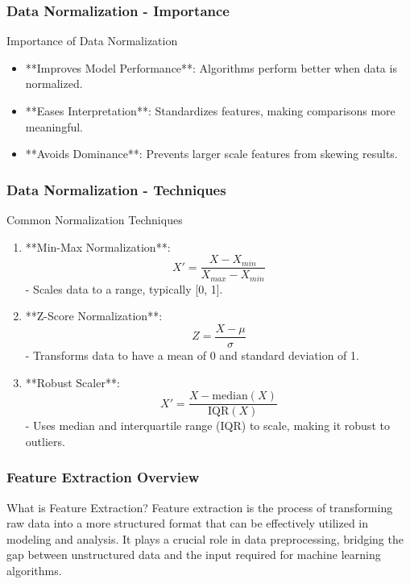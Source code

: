 \documentclass[aspectratio=169]{beamer}
\begin{document}
\begin{frame}[fragile]
    \frametitle{Data Normalization - Importance}
    \begin{block}{Importance of Data Normalization}
        \begin{itemize}
            \item **Improves Model Performance**: Algorithms perform better when data is normalized.
            \item **Eases Interpretation**: Standardizes features, making comparisons more meaningful.
            \item **Avoids Dominance**: Prevents larger scale features from skewing results.
        \end{itemize}
    \end{block}
\end{frame}

\begin{frame}[fragile]
    \frametitle{Data Normalization - Techniques}
    \begin{block}{Common Normalization Techniques}
        \begin{enumerate}
            \item **Min-Max Normalization**:
                \begin{equation}
                X' = \frac{X - X_{min}}{X_{max} - X_{min}}
                \end{equation}
                - Scales data to a range, typically [0, 1].
                
            \item **Z-Score Normalization**:
                \begin{equation}
                Z = \frac{X - \mu}{\sigma}
                \end{equation}
                - Transforms data to have a mean of 0 and standard deviation of 1.
                
            \item **Robust Scaler**:
                \begin{equation}
                X' = \frac{X - \text{median}(X)}{\text{IQR}(X)}
                \end{equation}
                - Uses median and interquartile range (IQR) to scale, making it robust to outliers.
        \end{enumerate}
    \end{block}
\end{frame}

\begin{frame}[fragile]
    \frametitle{Feature Extraction Overview}
    \begin{block}{What is Feature Extraction?}
        Feature extraction is the process of transforming raw data into a more structured format that can be effectively utilized in modeling and analysis. It plays a crucial role in data preprocessing, bridging the gap between unstructured data and the input required for machine learning algorithms.
    \end{block}
\end{frame}
\end{document}
